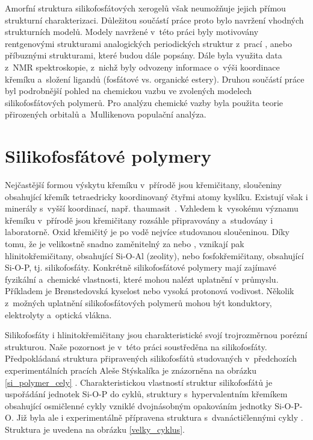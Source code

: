 \documentclass[
digital, %
table,   %
lof,     %
lot,     %
oneside,
]{fithesis3}
\begin{document}
Amorfní struktura silikofosfátových xerogelů však neumožňuje jejich přímou strukturní charakterizaci. Důležitou součástí práce proto bylo navržení vhodných strukturních modelů. Modely navržené v~této práci byly motivovány rentgenovými strukturami analogických periodických struktur z~prací \cite{C3NJ00721A}, \cite{rtg_4_pinkas} anebo příbuznými strukturami, které budou dále popsány. Dále byla využita data z~NMR spektroskopie, z~nichž byly odvozeny informace o~výši koordinace křemíku a~složení ligandů (fosfátové vs. organické estery)\cite{Styskalik2015thesis}. Druhou součástí práce byl podrobnější pohled na chemickou vazbu ve zvolených modelech silikofosfátových polymerů. Pro analýzu chemické vazby byla použita teorie přirozených orbitalů a~Mullikenova populační analýza.

\section{Silikofosfátové polymery}
Nejčastější formou výskytu křemíku v~přírodě jsou křemičitany, sloučeniny obsahující křemík tetraedricky koordinovaný čtyřmi atomy kyslíku. Existují však i minerály s~vyšší koordinací, např. thaumasit~\cite{Edge:a08100}. Vzhledem k~vysokému významu křemíku v~přírodě jsou křemičitany rozsáhle připravovány a~studovány i laboratorně. Oxid křemičitý  je po vodě nejvíce studovanou sloučeninou. Díky tomu, že  je velikostně snadno zaměnitelný za  nebo , vznikají pak hlinitokřemičitany, obsahující Si-O-Al (zeolity), nebo fosfokřemičitany, obsahující Si-O-P, tj. silikofosfáty. Konkrétně silikofosfátové polymery mají zajímavé fyzikální a~chemické vlastnosti, které mohou nalézt uplatnění v průmyslu. Příkladem je Brønstedovská kyselost nebo vysoká protonová vodivost. Několik z~možných uplatnění silikofosfátových polymerů mohou být konduktory, elektrolyty  a~optická vlákna.

Silikofosfáty i hlinitokřemičitany jsou charakteristické svojí trojrozměrnou  porézní strukturou. Naše pozornost je v~této práci soustředěna na silikofosfáty. Předpokládaná struktura připravených silikofosfátů studovaných v~předchozích experimentálních pracích Aleše Stýskalíka je znázorněna na obrázku \ref{si_polymer_cely} \cite{Styskalik2015thesis}. Charakteristickou vlastností struktur silikofosfátů je uspořádání jednotek Si-O-P do cyklů, struktury s~hypervalentním křemíkem obsahující osmičlenné cykly vzniklé dvojnásobným opakováním jednotky Si-O-P-O. Již byla ale i experimentálně přípravena struktura s~dvanáctičlennými cykly \cite{velky_cyklus}. Struktura je uvedena na obrázku \ref{velky_cyklus}.
\end{document}
